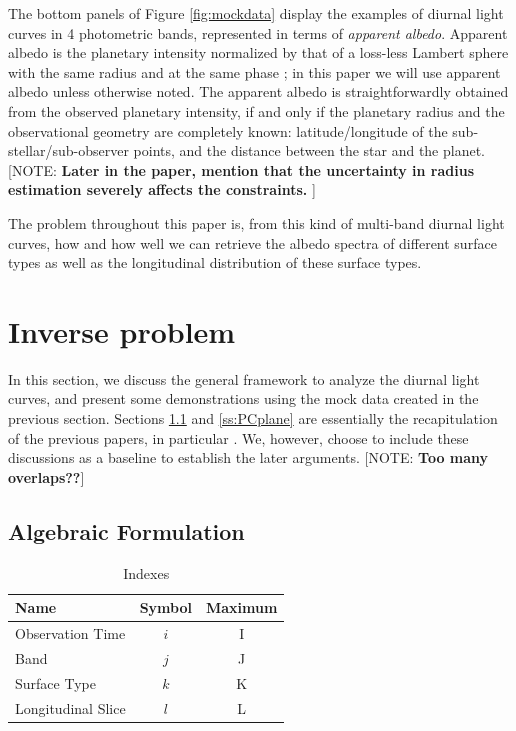 \documentclass[iop,numberedappendix,apj,]{emulateapj}
\def\memoYF#1{\color{red}[NOTE: {\bf #1}]\color{black}}
\begin{document}
The bottom panels of Figure \ref{fig:mockdata} display the examples of diurnal light curves in 4 photometric bands, represented in terms of {\it apparent albedo}. 
Apparent albedo is the planetary intensity normalized by that of a loss-less Lambert sphere with the same radius and at the same phase \citep{Qiu2003, Seager2010}; in this paper we will use apparent albedo unless otherwise noted. 
The apparent albedo is straightforwardly obtained from the observed planetary intensity, if and only if the planetary radius and the observational geometry are completely known: latitude/longitude of the sub-stellar/sub-observer points, and the distance between the star and the planet. 
\memoYF{Later in the paper, mention that the uncertainty in radius estimation severely affects the constraints. }

The problem throughout this paper is, from this kind of multi-band diurnal light curves, how and how well we can retrieve the albedo spectra of different surface types as well as the longitudinal distribution of these surface types. 


\section{Inverse problem}
\label{s:frame}

In this section, we discuss the general framework to analyze the diurnal light curves, and present some demonstrations using the mock data created in the previous section. 
Sections \ref{ss:model} and \ref{ss:PCplane} are essentially the recapitulation of the previous papers, in particular \citet{Cowan2013} \citep[but see also][]{Cowan2009,Cowan2011,Fujii2010,Fujii2011}.  
We, however, choose to include these discussions as a baseline to establish the later arguments. 
\memoYF{Too many overlaps??}

\subsection{Algebraic Formulation}
\label{ss:model}


\begin{table}[b]
\caption{Indexes}
\begin{center}
\begin{tabular}{lcc} \hline \hline
Name & Symbol & Maximum \\ \hline
Observation Time & $i$ & I \\
Band & $j$ & J  \\
Surface Type & $k$ & K  \\
Longitudinal Slice  & $l$ & L \\ \hline
\end{tabular}
\end{center}
\label{tab:index}
\end{table}%
\end{document}
